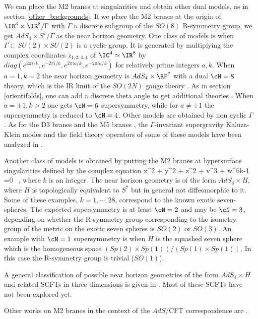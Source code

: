 We can place the M2 branes at singularities and obtain other dual
models, as in section \ref{other_backgrounds}.  If we place the M2 branes at
the origin of $\IR^3 \times
\IR^8/\Gamma$ with $\Gamma$ a discrete subgroup of the $SO(8)$
R-symmetry group, we get $AdS_4 \times S^7/\Gamma$ as the near horizon
geometry.  One class of models is when $\Gamma \subset SU(2) \times
SU(2)$ is a cyclic group.  It is generated by multiplying the complex
coordinates $z_{1,2,3,4}$ of $\IC^4 \simeq 
\IR^8$ by $diag(e^{2 \pi i/k},e^{-2 \pi
i/k},e^{2 \pi i a/k},e^{-2 \pi i a/k})$ for relatively prime integers
$a,k$.  When $a=1, k=2$ the near horizon geometry is $AdS_4 \times
\RP^7$ with a dual $\cN=8$ theory, which is the IR limit of the 
$SO(2N)$ gauge theory \cite{Aharony:1998mt}. As in section
\ref{orientifolds}, one can add a discrete theta angle to get
additional theories \cite{Sethi:1998zk,Berkooz:1999sn}. When $a=\pm 1,
k > 2$ one gets $\cN=6$ supersymmetry, while for $a\neq \pm 1$ the
supersymmetry is reduced to $\cN=4$.  Other models are obtained by non
cyclic $\Gamma$.  As for the D3 branes \cite{Oz:1998of} and the M5
branes \cite{Ahn:1998oa}, the $\Gamma$-invariant supergravity
Kaluza-Klein modes and the field theory operators of some of these
models have been analyzed in
\cite{Entin:1998so}.

Another class of models is obtained by putting the M2 branes at hypersurface singularities
defined by the complex equation
\beq
x^2 + y^2 + z^2 + v^3 + w^{6k-1} =0  \ ,
\eeq
where $k$ is an integer.  The near horizon geometry is of the form
$AdS_4 \times H$, where $H$ is topologically equivalent to $S^7$ but in
general not diffeomorphic to it.  Some of these examples,
$k=1,\cdots,28$, correspond to the known exotic seven-spheres.  The
expected supersymmetry is at least $\cN=2$ and may be $\cN=3$, depending
on whether the R-symmetry group corresponding to the isometry
group of the metric on the exotic seven spheres is $SO(2)$ or $SO(3)$.
An example with $\cN=1$ supersymmetry is when $H$ is the squashed
seven sphere which is the homogeneous space $(Sp(2) \times Sp(1))/(Sp(1)
\times Sp(1))$.  In this case the R-symmetry group is trivial ($SO(1)$).

A general classification of possible near horizon geometries of
the form $AdS_4 \times H$ and related SCFTs in three dimensions is
given in \cite{Morrison:1998cs, Acharya:1998db}.  Most of these SCFTs
have not been explored yet.

Other works on M2 branes in the context of the $AdS/$CFT correspondence are 
\cite{Ferrara:1998vf,Gomis:1998xj,Ahn:1998sv,deWit:1998yu,Claus:1999fh,
Oh:1999qi,Ahn:1998vm,Duff:1999gh,
Furuuchi:1999tn,Fabbri:1999mk,Berkooz:1999ji,
Dall'Agata:1999hh}.

